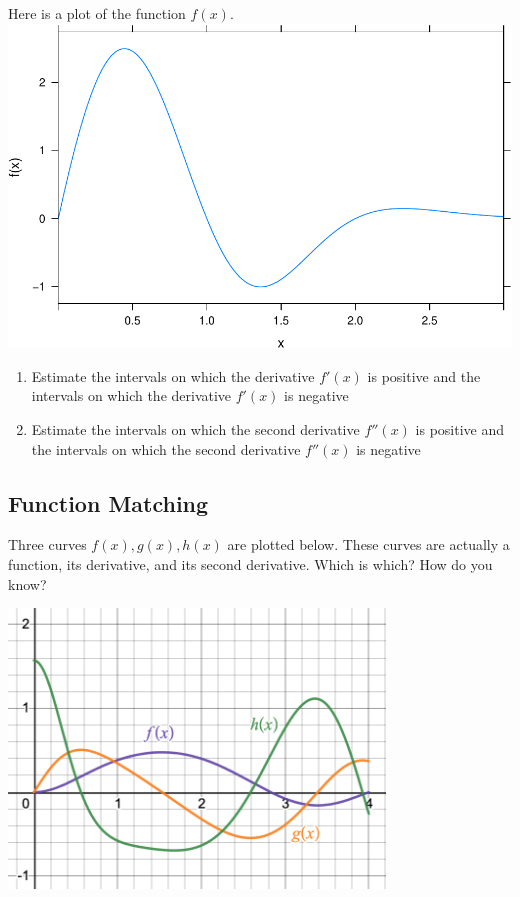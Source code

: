 \documentclass[
]{book}
\providecommand{\tightlist}{%
  \setlength{\itemsep}{0pt}\setlength{\parskip}{0pt}}
\begin{document}
Here is a plot of the function \(f(x)\).
\includegraphics{_bookdown_files/math135_handbook_files/figure-latex/unnamed-chunk-86-1.pdf}

\begin{enumerate}
\def\labelenumi{\arabic{enumi}.}
\tightlist
\item
  Estimate the intervals on which the derivative \(f'(x)\) is positive and the intervals on which the derivative \(f'(x)\) is negative
\item
  Estimate the intervals on which the second derivative \(f''(x)\) is positive and the intervals on which the second derivative \(f''(x)\) is negative
\end{enumerate}

\hypertarget{function-matching}{%
\subsection{Function Matching}\label{function-matching}}

Three curves \(f(x), g(x), h(x)\) are plotted below. These curves are actually a function, its derivative, and its second derivative. Which is which? How do you know?

\includegraphics[width=0.75\textwidth,height=\textheight]{images/deriv-higher.png}
\end{document}
